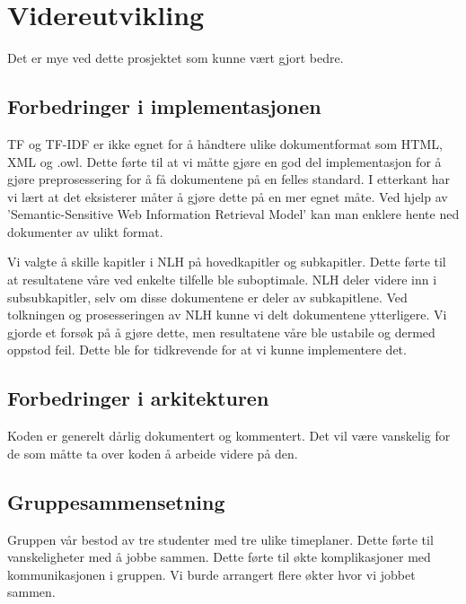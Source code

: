 \section{Videreutvikling}
\label{improvements}

Det er mye ved dette prosjektet som kunne vært gjort bedre. 

\subsection{Forbedringer i implementasjonen}
TF og TF-IDF er ikke egnet for å håndtere ulike dokumentformat som HTML, XML og .owl. Dette førte til at vi måtte gjøre en god del implementasjon for å gjøre preprosessering for å få dokumentene på en felles standard. I etterkant har vi lært at det eksisterer måter å gjøre dette på en mer egnet måte. Ved hjelp av 'Semantic-Sensitive Web Information Retrieval Model' kan man enklere hente ned dokumenter av ulikt format. %

Vi valgte å skille kapitler i NLH på hovedkapitler og subkapitler. Dette førte til at resultatene våre ved enkelte tilfelle ble suboptimale. NLH deler videre inn i subsubkapitler, selv om disse dokumentene er deler av subkapitlene. Ved tolkningen og prosesseringen av NLH kunne vi delt dokumentene ytterligere. Vi gjorde et forsøk på å gjøre dette, men resultatene våre ble ustabile og dermed oppstod feil. Dette ble for tidkrevende for at vi kunne implementere det. 

\subsection{Forbedringer i arkitekturen}
Koden er generelt dårlig dokumentert og kommentert. Det vil være vanskelig for de som måtte ta over koden å arbeide videre på den. 


\subsection{Gruppesammensetning}
Gruppen vår bestod av tre studenter med tre ulike timeplaner. Dette førte til vanskeligheter med å jobbe sammen. Dette førte til økte komplikasjoner med kommunikasjonen i gruppen. Vi burde arrangert flere økter hvor vi jobbet sammen. 